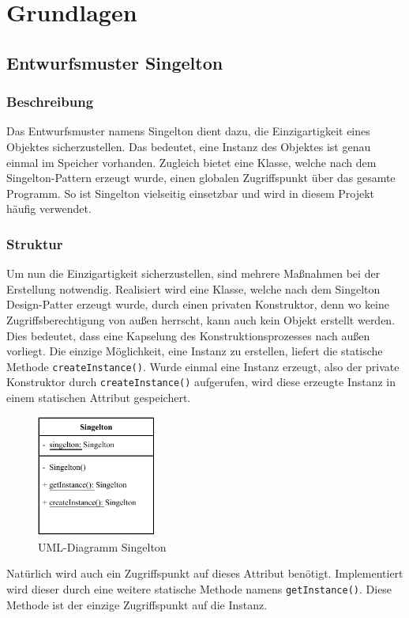 \section{Grundlagen}\label{sec:grundlagen}
\subsection{Entwurfsmuster Singelton}\label{subsec:entwurdsmuster-singelton}
\subsubsection{Beschreibung}
Das Entwurfsmuster namens Singelton dient dazu, die Einzigartigkeit eines Objektes sicherzustellen.
Das bedeutet, eine Instanz des Objektes ist genau einmal im Speicher vorhanden.
Zugleich bietet eine Klasse, welche nach dem Singelton-Pattern erzeugt wurde, einen globalen Zugriffspunkt über das gesamte Programm.
So ist Singelton vielseitig einsetzbar und wird in diesem Projekt häufig verwendet.
\subsubsection{Struktur}
Um nun die Einzigartigkeit sicherzustellen, sind mehrere Maßnahmen bei der Erstellung notwendig.
Realisiert wird eine Klasse, welche nach dem Singelton Design-Patter erzeugt wurde, durch einen privaten Konstruktor, denn wo keine Zugriffsberechtigung von außen herrscht, kann auch kein Objekt erstellt werden.
Dies bedeutet, dass eine Kapselung des Konstruktionsprozesses nach außen vorliegt.
Die einzige Möglichkeit, eine Instanz zu erstellen, liefert die statische Methode \lstinline{createInstance()}.
Wurde einmal eine Instanz erzeugt, also der private Konstruktor durch \lstinline{createInstance()} aufgerufen, wird diese erzeugte Instanz in einem statischen Attribut gespeichert.\\
\begin{figure}[H]
    \centering
    \includegraphics[width=0.35\textwidth]{fig/ainf/Singelton.pdf}
    \caption{\acs{UML}-Diagramm Singelton}
\end{figure}
Natürlich wird auch ein Zugriffspunkt auf dieses Attribut benötigt.
Implementiert wird dieser durch eine weitere statische Methode namens \lstinline{getInstance()}.
Diese Methode ist der einzige Zugriffspunkt auf die Instanz.
